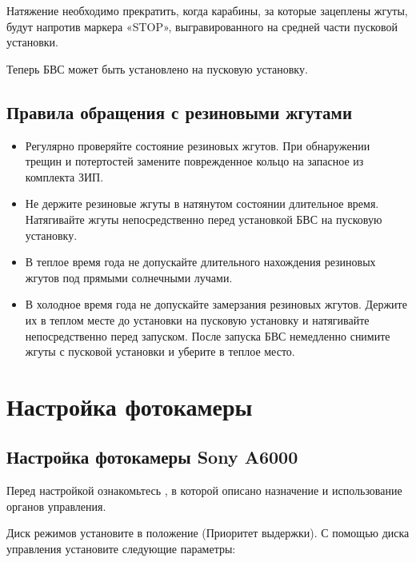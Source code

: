 \documentclass[a4paper,10pt,russian,openany]{sphinxmanual}
\begin{document}
Натяжение необходимо прекратить, когда карабины, за которые зацеплены жгуты, будут напротив маркера «STOP», выгравированного на средней части пусковой установки.

Теперь БВС может быть установлено на пусковую установку.


\section{Правила обращения с резиновыми жгутами}
\label{\detokenize{catapult:id4}}\begin{itemize}
\item {} 
Регулярно проверяйте состояние резиновых жгутов. При обнаружении трещин и потертостей замените поврежденное кольцо на запасное из комплекта ЗИП.

\item {} 
Не держите резиновые жгуты в натянутом состоянии длительное время. Натягивайте жгуты непосредственно перед установкой БВС на пусковую установку.

\item {} 
В теплое время года не допускайте длительного нахождения резиновых жгутов под прямыми солнечными лучами.

\item {} 
В холодное время года не допускайте замерзания резиновых жгутов. Держите их в теплом месте до установки на пусковую установку и натягивайте непосредственно перед запуском. После запуска БВС немедленно снимите жгуты с пусковой установки и уберите в теплое место.

\end{itemize}


\chapter{Настройка фотокамеры}
\label{\detokenize{camera:id1}}\label{\detokenize{camera::doc}}

\section{Настройка фотокамеры Sony A6000}
\label{\detokenize{camera:sony-a6000}}
Перед настройкой ознакомьтесь  , в которой описано назначение и использование органов управления.

Диск режимов установите в положение  (Приоритет выдержки).
С помощью диска управления установите следующие параметры:
\end{document}
